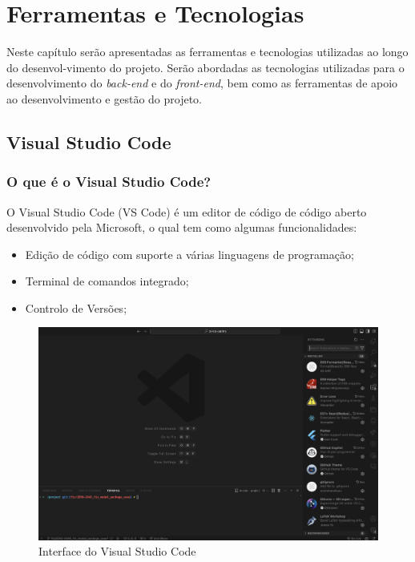 
\chapter{Ferramentas e Tecnologias}

Neste capítulo serão apresentadas as ferramentas e tecnologias utilizadas ao longo do desenvol-vimento do projeto. Serão abordadas as tecnologias utilizadas para o desenvolvimento do \textit{back-end} e do \textit{front-end}, bem como as ferramentas de apoio ao desenvolvimento e gestão do projeto.

\section{Visual Studio Code}
    
    \subsection{O que é o Visual Studio Code?}
        O Visual Studio Code (VS Code) é um editor de código de código aberto desenvolvido pela Microsoft, o qual tem como algumas funcionalidades:
        \begin{itemize}
            \item Edição de código com suporte a várias linguagens de programação;
            \item Terminal de comandos integrado;
            \item Controlo de Versões;
        \end{itemize}
        \begin{figure}[h]
            \centering
            \includegraphics[width=1\textwidth]{Imagens/visual_studio_code.png} %
            \caption{Interface do Visual Studio Code}
            \label{fig:vscode}
        \end{figure}

